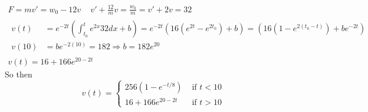 \documentclass[twoside]{amsart}
\theoremstyle{plain}
\theoremstyle{definition}
\begin{document}
\[
\begin{gathered}
  F = mv' = w_0 - 12 v \quad \, v' + \frac{12}{m}v = \frac{w_0}{m} = v' + 2 v =32 \\
\begin{aligned}
  v(t) & = e^{-2t} \left( \int_{t_0}^t e^{2x} 32 dx + b \right) = e^{-2t} \left( 16 (e^{2t} - e^{2t_0}) + b \right)  = \left( 16 ( 1 - e^{2 (t_0 - t) } ) + b e^{-2t} \right) \\
  v(10) & = be^{-2(10)} = 182 \Longrightarrow b = 182 e^{20} 
\end{aligned} \\
v(t) = 16 + 166e^{20 - 2t }
\end{gathered}
\]
So then 
\[
v(t) = \begin{cases} 256(1- e^{-t/8}) & \text{ if } t < 10 \\ 16 + 166e^{20-2t} & \text{ if } t > 10 \end{cases} 
\]
\end{document}
